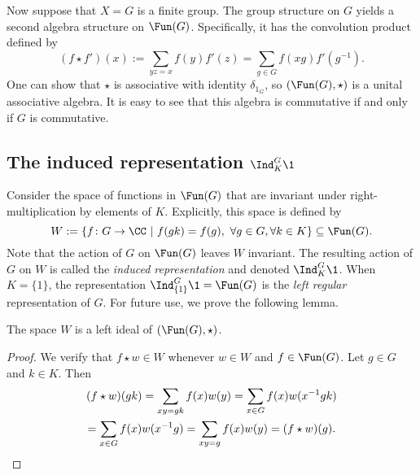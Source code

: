 Now suppose that $X=G$ is a finite group.
The group structure on $G$ yields a second algebra structure on $\Fun(G)$.
Specifically, it has the convolution product defined by
\[
	(f\star f')(x) := \sum_{yz = x} f(y)f'(z) = \sum_{g\in G} f(xg)f'(g^{-1}).
\]
One can show that $\star$ is associative with identity $\delta_{1_G}$, so $(\Fun(G),\star)$ is a unital associative algebra.
It is easy to see that this algebra is commutative if and only if $G$ is commutative.


\subsection{The induced representation $\Ind_K^G \1$}\label{Section1.2}
Consider the space of functions in $\Fun(G)$ that are invariant under right-multiplication by elements of $K$.
Explicitly, this space is defined by
\[
	W: = \{f\colon G\to \CC\ |\ f(gk) = f(g),\ \forall g\in G, \forall k \in K\} \subseteq \Fun(G).
\]
Note that the action of $G$ on $\Fun(G)$ leaves $W$ invariant.
The resulting action of $G$ on $W$ is called the \emph{induced representation} and denoted $\Ind_K^G \1$.
When $K=\{1\}$, the representation $\Ind_{\{1\}}^G\1=\Fun(G)$ is the \emph{left regular} representation of $G$.
For future use, we prove the following lemma.
\begin{lem}\label{lemma: W_left_ideal}
	The space $W$ is a left ideal of $(\Fun(G),\star)$.
\end{lem}
\begin{proof}
	We verify that $f\star w\in W$ whenever $w\in W$ and $f\in\Fun(G)$.
	Let $g\in G$ and $k\in K$.
	Then
	\begin{multline*}
		(f\star w)(gk) = \sum_{xy=gk} f(x)w(y) = \sum_{x\in G} f(x)w(x^{-1}gk) \\
		= \sum_{x\in G} f(x)w(x^{-1}g) = \sum_{xy=g} f(x)w(y) = (f\star w)(g).\qedhere
	\end{multline*}
\end{proof}


